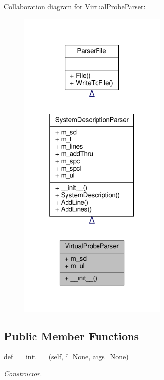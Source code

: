 Collaboration diagram for Virtual\+Probe\+Parser\+:\nopagebreak
\begin{figure}[H]
\begin{center}
\leavevmode
\includegraphics[width=208pt]{classSignalIntegrity_1_1Parsers_1_1VirtualProbeParser_1_1VirtualProbeParser__coll__graph}
\end{center}
\end{figure}
\subsection*{Public Member Functions}
\begin{DoxyCompactItemize}
\item 
def \hyperlink{classSignalIntegrity_1_1Parsers_1_1VirtualProbeParser_1_1VirtualProbeParser_af9856388f7022892c3159ad55872a27e}{\+\_\+\+\_\+init\+\_\+\+\_\+} (self, f=None, args=None)
\begin{DoxyCompactList}\small\item\em Constructor. \end{DoxyCompactList}\end{DoxyCompactItemize}


